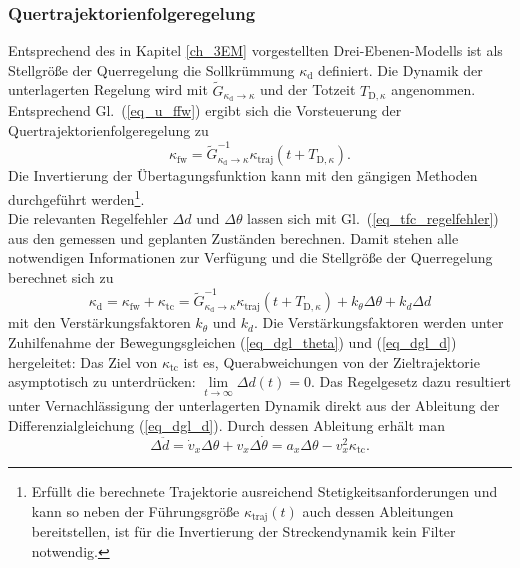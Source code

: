 \subsubsection{Quertrajektorienfolgeregelung}
Entsprechend des in Kapitel \ref{ch_3EM} vorgestellten Drei-Ebenen-Modells ist als Stellgröße der Querregelung die Sollkrümmung $\kappa_\mathrm{d}$ definiert.  Die Dynamik der unterlagerten Regelung wird mit $\tilde G_{\kappa_\mathrm{d} \rightarrow \kappa }$ und der Totzeit $T_{\mathrm{D},\kappa}$ angenommen.  Entsprechend Gl.~(\ref{eq_u_ffw}) ergibt sich die Vorsteuerung der Quertrajektorienfolgeregelung zu
\begin{equation}
 \kappa_\mathrm{fw} = \tilde G_{\kappa_\mathrm{d} \rightarrow \kappa}^{-1}  \kappa_\mathrm{traj} (t+T_{\mathrm{D},\kappa}).
\end{equation}
Die Invertierung der Übertagungsfunktion kann mit den gängigen Methoden durchgeführt werden\footnote{Erfüllt die berechnete Trajektorie ausreichend Stetigkeitsanforderungen und kann so neben der Führungsgröße $\kappa_\mathrm{traj}(t)$ auch dessen Ableitungen bereitstellen, ist für die Invertierung der Streckendynamik kein Filter notwendig.}.\\
Die relevanten Regelfehler $\Delta d$ und $\Delta \theta$ lassen sich mit Gl.~(\ref{eq_tfc_regelfehler}) aus den gemessen und geplanten Zuständen berechnen.
Damit stehen alle notwendigen Informationen zur Verfügung und die Stellgröße der Querregelung berechnet sich zu
\begin{equation}
\kappa_\mathrm{d} = \kappa_\mathrm{fw} + \kappa_\mathrm{tc} = \tilde G_{\kappa_\mathrm{d} \rightarrow \kappa}^{-1}  \kappa_\mathrm{traj} (t+T_{\mathrm{D},\kappa})+ k_{\theta} \Delta \theta + k_d \Delta d
\end{equation}
mit den Verstärkungsfaktoren $k_{\theta}$ und $k_d$.  Die Verstärkungsfaktoren werden unter Zuhilfenahme der Bewegungsgleichen (\ref{eq_dgl_theta}) und (\ref{eq_dgl_d}) hergeleitet: Das Ziel von $\kappa_\mathrm{tc}$ ist es, Querabweichungen von der Zieltrajektorie asymptotisch zu unterdrücken: $\mathop {\lim }\limits_{t \to \infty } \Delta d(t) =0$.
Das Regelgesetz dazu resultiert unter Vernachlässigung der unterlagerten Dynamik direkt aus der Ableitung der Differenzialgleichung (\ref{eq_dgl_d}).  Durch dessen Ableitung erhält man
\begin{equation}
\Delta \ddot d = \dot v_x \Delta \theta + v_x \Delta\dot{{ \theta}} = a_x \Delta \theta - v_x^2 \kappa_\mathrm{tc}.
\end{equation}
